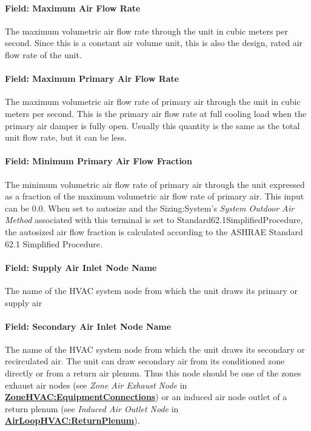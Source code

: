 \paragraph{Field: Maximum Air Flow Rate}\label{field-maximum-air-flow-rate-6}

The maximum volumetric air flow rate through the unit in cubic meters per second. Since this is a constant air volume unit, this is also the design, rated air flow rate of the unit.

\paragraph{Field: Maximum Primary Air Flow Rate}\label{field-maximum-primary-air-flow-rate}

The maximum volumetric air flow rate of primary air through the unit in cubic meters per second. This is the primary air flow rate at full cooling load when the primary air damper is fully open. Usually this quantity is the same as the total unit flow rate, but it can be less.

\paragraph{Field: Minimum Primary Air Flow Fraction}\label{field-minimum-primary-air-flow-fraction}

The minimum volumetric air flow rate of primary air through the unit expressed as a fraction of the maximum volumetric air flow rate of primary air. This input can be 0.0. When set to autosize and the Sizing:System's \emph{System Outdoor Air Method} associated with this terminal is set to Standard62.1SimplifiedProcedure, the autosized air flow fraction is calculated according to the ASHRAE Standard 62.1 Simplified Procedure.

\paragraph{Field: Supply Air Inlet Node Name}\label{field-supply-air-inlet-node-name}

The name of the HVAC system node from which the unit draws its primary or supply air

\paragraph{Field: Secondary Air Inlet Node Name}\label{field-secondary-air-inlet-node-name}

The name of the HVAC system node from which the unit draws its secondary or recirculated air. The unit can draw secondary air from its conditioned zone directly or from a return air plenum. Thus this node should be one of the zones exhaust air nodes (see \emph{Zone Air Exhaust Node} in \textbf{\hyperref[zonehvacequipmentconnections]{ZoneHVAC:EquipmentConnections}}) or an induced air node outlet of a return plenum (see \emph{Induced Air Outlet Node} in \textbf{\hyperref[airloophvacreturnplenum]{AirLoopHVAC:ReturnPlenum}}).

